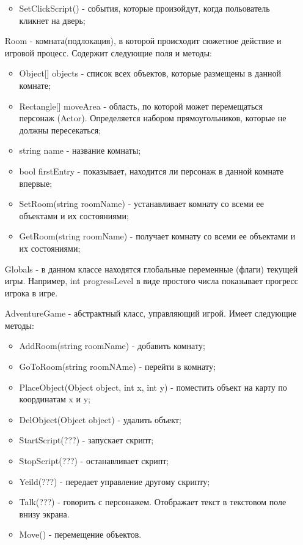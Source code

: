 \begin{enumerate}
\begin{itemize}
		\item SetClickScript() - события, которые произойдут, когда польователь кликнет на дверь;
	\end{itemize}
	\item[Room] - комната(подлокация), в которой происходит сюжетное действие и игровой процесс. Содержит следующие поля и методы:
	\begin{itemize}
		\item Object[] objects - список всех объектов, которые размещены в данной комнате;
		\item Rectangle[] moveArea - область, по которой может перемещаться персонаж (Actor). Определяется набором прямоугольников, которые не должны пересекаться;
		\item string name - название комнаты;
		\item bool firstEntry - показывает, находится ли персонаж в данной комнате впервые;
		\item SetRoom(string roomName) - устанавливает комнату со всеми ее объектами и их состояниями;
		\item GetRoom(string roomName) - получает комнату со всеми ее объектами и их состояниями;
	\end{itemize}
	\item[Globals] - в данном классе находятся глобальные переменные (флаги) текущей игры. Например, int progressLevel в виде простого числа показывает прогресс игрока в игре.
	\item[AdventureGame] - абстрактный класс, управляющий игрой. Имеет следующие методы:
	\begin{itemize}
		\item AddRoom(string roomName) - добавить комнату;
		\item GoToRoom(string roomNAme) - перейти в комнату;
		\item PlaceObject(Object object, int x, int y) - поместить объект на карту по координатам x и y;
		\item DelObject(Object object) - удалить объект;
		\item StartScript(???) - запускает скрипт;
		\item StopScript(???) - останавливает скрипт;
		\item Yeild(???) - передает управление другому скрипту;
		\item Talk(???) - говорить с персонажем. Отображает текст в текстовом поле внизу экрана. 
		\item Move() - перемещение объектов.
	\end{itemize}
\end{enumerate}




